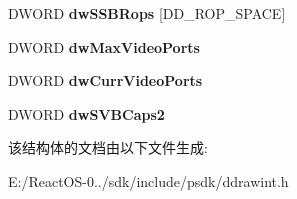 \begin{DoxyCompactItemize}
D\+W\+O\+RD {\bfseries dw\+S\+S\+B\+Rops} \mbox{[}D\+D\+\_\+\+R\+O\+P\+\_\+\+S\+P\+A\+CE\mbox{]}
\item 
\mbox{\label{struct___d_d_n_t_c_o_r_e_c_a_p_s_a1dec18e792083b33a77d7f42cdbad6ef}} 
D\+W\+O\+RD {\bfseries dw\+Max\+Video\+Ports}
\item 
\mbox{\label{struct___d_d_n_t_c_o_r_e_c_a_p_s_acb3f267a799989590c35fec1bf02866e}} 
D\+W\+O\+RD {\bfseries dw\+Curr\+Video\+Ports}
\item 
\mbox{\label{struct___d_d_n_t_c_o_r_e_c_a_p_s_a80fe75d09a4073f3cbf072e1dfff597c}} 
D\+W\+O\+RD {\bfseries dw\+S\+V\+B\+Caps2}
\end{DoxyCompactItemize}


该结构体的文档由以下文件生成\+:\begin{DoxyCompactItemize}
\item 
E\+:/\+React\+O\+S-\/0../sdk/include/psdk/ddrawint.\+h\end{DoxyCompactItemize}
